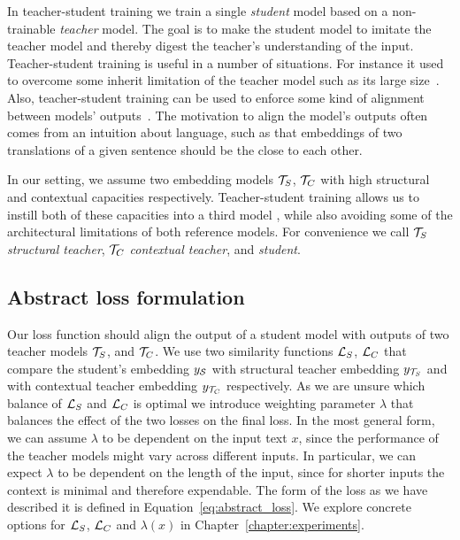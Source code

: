 In teacher-student training we train a single \emph{student} model based on a
non-trainable \emph{teacher} model. The goal is to make the student model to
imitate the teacher model and thereby digest the teacher's understanding of the
input. Teacher-student training is useful in a number of situations. For
instance it used to overcome some inherit limitation of the teacher model such
as its large size~\citep{sanh2019distilbert}. Also, teacher-student training
can be used to enforce some kind of alignment between models'
outputs~\citep{reimers2020making}. The motivation to align the model's outputs
often comes from an intuition about language, such as that embeddings of
two translations of a given sentence should be the close to each other.

In our setting, we assume two embedding models $\mathcal{T}_S$, $\mathcal{T}_C$ with
high structural and contextual capacities respectively. Teacher-student
training allows us to instill both of these capacities into a third model
{\Student}, while also avoiding some of the architectural limitations of both
reference models. For convenience we call $\mathcal{T}_S$ \emph{structural
teacher}, $\mathcal{T}_C$ \emph{contextual teacher}, and {\Student}
\emph{student}.


\subsection{Abstract loss formulation}


Our loss function should align the output of a student model {\Student} with
outputs of two teacher models $\mathcal{T}_S$, and $\mathcal{T}_C$. We use two
similarity functions $\mathcal{L}_S$, $\mathcal{L}_C$ that compare the student's embedding
$y_{\mathcal{S}}$ with structural teacher embedding $y_{\mathcal{T}_S}$ and with
contextual teacher embedding $y_{\mathcal{T}_C}$ respectively. As we are unsure
which balance of $\mathcal{L}_S$ and $\mathcal{L}_C$ is optimal we introduce weighting
parameter $\lambda$ that balances the effect of the two losses on the final
loss. In the most general form, we can assume $\lambda$ to be dependent on the
input text $x$, since the performance of the teacher models might vary across
different inputs. In particular, we can expect $\lambda$ to be dependent on the
length of the input, since for shorter inputs the context is minimal and
therefore expendable. The form of the loss as we have described it is defined
in Equation~\ref{eq:abstract_loss}. We explore concrete options for $\mathcal{L}_S$,
$\mathcal{L}_C$ and $\lambda(x)$ in Chapter~\ref{chapter:experiments}.


